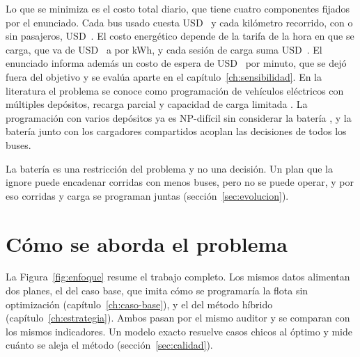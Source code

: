 Lo que se minimiza es el costo total diario, que tiene cuatro componentes fijados por el enunciado. Cada bus usado cuesta USD~\CostoBus{} y cada kilómetro recorrido, con o sin pasajeros, USD~\CostoKmUnit. El costo energético depende de la tarifa de la hora en que se carga, que va de USD~\TarifaMin{} a \TarifaMax{} por kWh, y cada sesión de carga suma USD~\CostoSesion. El enunciado informa además un costo de espera de USD~\CostoEsperaMinuto{} por minuto, que se dejó fuera del objetivo y se evalúa aparte en el capítulo~\ref{ch:sensibilidad}. En la literatura el problema se conoce como programación de vehículos eléctricos con múltiples depósitos, recarga parcial y capacidad de carga limitada \cite{perumal_evspreview_2022}. La programación con varios depósitos ya es NP-difícil sin considerar la batería \cite{kliewer_timespacemdvsp_2006}, y la batería junto con los cargadores compartidos acoplan las decisiones de todos los buses.

La batería es una restricción del problema y no una decisión. Un plan que la ignore puede encadenar corridas con menos buses, pero no se puede operar, y por eso corridas y carga se programan juntas (sección~\ref{sec:evolucion}).

\section{Cómo se aborda el problema}
\label{sec:enfoque}

La Figura~\ref{fig:enfoque} resume el trabajo completo. Los mismos datos alimentan dos planes, el del caso base, que imita cómo se programaría la flota sin optimización (capítulo~\ref{ch:caso-base}), y el del método híbrido (capítulo~\ref{ch:estrategia}). Ambos pasan por el mismo auditor y se comparan con los mismos indicadores. Un modelo exacto resuelve casos chicos al óptimo y mide cuánto se aleja el método (sección~\ref{sec:calidad}).

